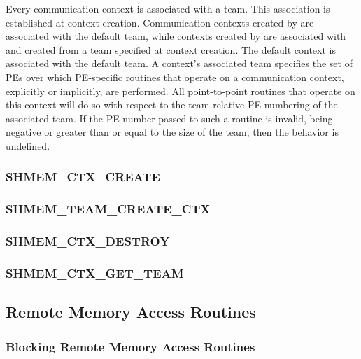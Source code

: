 \documentclass[10pt]{book}
\begin{document}
Every communication context is associated with a team.
This association is established at context creation.
Communication contexts created by  are
associated with the default team, while contexts created by
 are associated with and created from a team
specified at context creation.
The default context is associated with the default team.
A context's associated team specifies the set of \acp{PE} over which
\ac{PE}-specific routines that operate on a communication context,
explicitly or implicitly, are performed.
All point-to-point routines that operate on this context will do so with
respect to the team-relative \ac{PE} numbering of the associated team.
If the PE number passed to such a routine is invalid, being negative or greater
than or equal to the size of the \openshmem team, then the behavior is undefined.

\subsubsection{\textbf{SHMEM\_CTX\_CREATE}}
\label{subsec:shmem_ctx_create}


\subsubsection{\textbf{SHMEM\_TEAM\_CREATE\_CTX}}
\label{subsec:shmem_team_create_ctx}


\subsubsection{\textbf{SHMEM\_CTX\_DESTROY}}
\label{subsec:shmem_ctx_destroy}


\subsubsection{\textbf{SHMEM\_CTX\_GET\_TEAM}}
\label{subsec:shmem_ctx_get_team}



\subsection{Remote Memory Access Routines}\label{sec:rma}


\subsubsection{Blocking Remote Memory Access Routines}\label{sec:rma_nbi}
\label{subsec:shmem_put}

\end{document}
